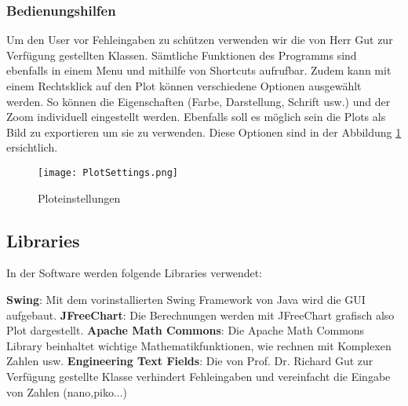 \subsubsection{Bedienungshilfen}\label{subsubsec:bedienungshilfen}
Um den User vor Fehleingaben zu schützen verwenden wir die von Herr Gut zur Verfügung gestellten Klassen.
Sämtliche Funktionen des Programms sind ebenfalls in einem Menu und mithilfe von Shortcuts aufrufbar.
Zudem kann mit einem Rechtsklick auf den Plot können verschiedene Optionen ausgewählt werden. So können die Eigenschaften (Farbe, Darstellung, Schrift usw.) und der Zoom individuell eingestellt werden. Ebenfalls soll es möglich sein die Plots als Bild zu exportieren um sie zu verwenden. Diese Optionen sind in der Abbildung \ref{fig:PlotSettings} ersichtlich.
\begin{figure}[H]
	\centering
	\texttt{[image: PlotSettings.png]}
	\caption{Ploteinstellungen}
	\label{fig:PlotSettings}
\end{figure} 
\bigskip


\begin{comment}
\paragraph{Simulation} \label{para:simulation}
Im Menupunkt "Simulation" kann die Simulationsart Monte Carlo ausgewählt werden(F8, Tabelle:\ref{tab:ziele}). Es öffnet sich ein neues Fenster in dem der Parameter, die Toleranz und die Anzahl Messungen eingestellt werden kann. Dieser Menupunkt ist in der Abbildung \ref{fig:GUISimulation} dargestellt.

\begin{figure}[H]
	\centering
	\texttt{[image: GUISimulation.png]}
	\caption{Menuoption Simulation}
	\label{fig:GUISimulation}
\end{figure}
\end{comment}

\subsection{Libraries} \label{subsec:Libraries}

In der Software werden folgende Libraries verwendet:

\textbf{Swing}: Mit dem vorinstallierten Swing Framework von Java wird die GUI aufgebaut.\newline
\textbf{JFreeChart}: Die Berechnungen werden mit JFreeChart grafisch also Plot dargestellt. \cite{jfreechart} \newline
\textbf{Apache Math Commons}: Die Apache Math Commons Library beinhaltet wichtige Mathematikfunktionen, wie rechnen mit Komplexen Zahlen usw. \cite{apache}\newline
\textbf{Engineering Text Fields}: Die von Prof. Dr. Richard Gut zur Verfügung gestellte Klasse verhindert Fehleingaben und vereinfacht die Eingabe von Zahlen (nano,piko...)

\newpage
